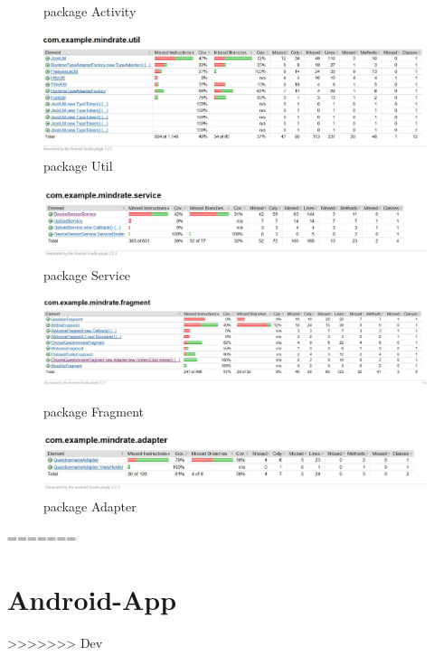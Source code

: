\documentclass[a4paper]{scrreprt}
\begin{document}
\begin{itemize}
\begin{figure}[ht]
                    \caption{package Activity}
                \end{figure}
                \begin{figure}[ht]
                    \centering
                    \includegraphics[scale = 0.5]{packageUtil.jpg}
                    \caption{package Util}
                \end{figure}
                \begin{figure}[ht]
                    \centering
                    \includegraphics[scale = 0.6]{packageService.jpg}
                    \caption{package Service}
                \end{figure}
                \begin{figure}[ht]
                    \centering
                    \includegraphics[scale = 0.4]{packageFragment.jpg}
                    \caption{package Fragment}
                \end{figure}
                \begin{figure}[ht]
                    \centering
                    \includegraphics[scale = 0.5]{packageAdapter.jpg}
                    \caption{package Adapter}
                \end{figure}
                \end{itemize}
=======
			
			
			\section{Android-App}

>>>>>>> Dev
\end{document}
